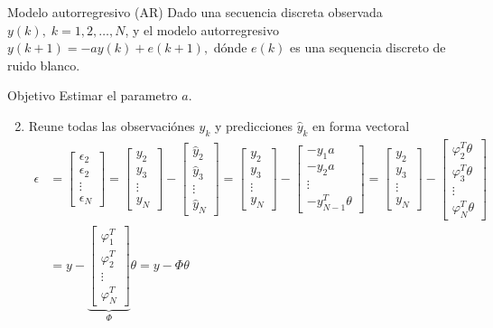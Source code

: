 \documentclass[presentation,aspectratio=169]{beamer}
\begin{document}
\begin{frame}[label={sec:org27eb1d8}]{Modelo autorregresivo (AR)}
Dado una secuencia discreta observada \(y(k), \; k=1,2,\ldots,N\), y el modelo autorregresivo
\(y(k+1) = -ay(k) + e(k+1),\)
dónde \(e(k)\) es una sequencia discreto de ruido blanco.

\alert{Objetivo} Estimar el parametro \(a\).

\begin{enumerate}
\setcounter{enumi}{1}
\item Reune todas las observaciónes \(y_k\) y predicciones \(\hat{y}_k\) en forma vectoral
\begin{align*}
\epsilon &= \begin{bmatrix} \epsilon_2\\\epsilon_2\\\vdots\\\epsilon_N\end{bmatrix} =  \begin{bmatrix} y_2\\ y_3\\\vdots\\y_N \end{bmatrix} - \begin{bmatrix} \hat{y}_2\\ \hat{y}_3\\\vdots\\\hat{y}_N \end{bmatrix}
 =  \begin{bmatrix} y_2\\ y_3\\\vdots\\y_N \end{bmatrix} - \begin{bmatrix} -y_1 a\\ -y_2 a\\\vdots\\-y_{N-1}^T\theta \end{bmatrix} =  \begin{bmatrix} y_2\\ y_3\\\vdots\\y_N \end{bmatrix} - \begin{bmatrix} \varphi_2^T\theta\\ \varphi_3^T\theta\\\vdots\\\varphi_N^T\theta \end{bmatrix}\\
&= y - \underbrace{\begin{bmatrix}\varphi_1^T\\\varphi_2^T\\\vdots\\\varphi_N^T\end{bmatrix}}_{\Phi}\theta = y - \Phi\theta 
\end{align*}
\end{enumerate}
\end{frame}
\end{document}
